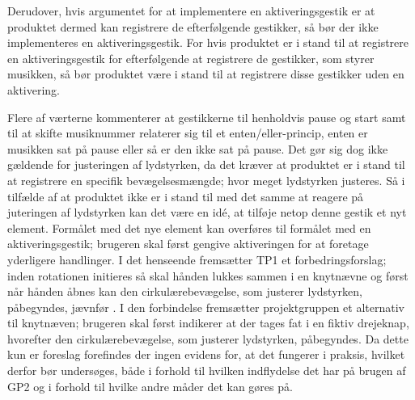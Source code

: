 Derudover, hvis argumentet for at implementere en aktiveringsgestik er at produktet dermed kan registrere de efterfølgende gestikker, så bør der ikke implementeres en aktiveringsgestik. For hvis produktet er i stand til at registrere en aktiveringsgestik for efterfølgende at registrere de gestikker, som styrer musikken, så bør produktet være i stand til at registrere disse gestikker uden en aktivering. 

Flere af værterne kommenterer at gestikkerne til henholdvis pause og start samt til at skifte musiknummer relaterer sig til et enten/eller-princip, enten er musikken sat på pause eller så er den ikke sat på pause. Det gør sig dog ikke gældende for justeringen af lydstyrken, da det kræver at produktet er i stand til at registrere en specifik bevægelsesmængde; hvor meget lydstyrken justeres. Så i tilfælde af at produktet ikke er i stand til med det samme at reagere på juteringen af lydstyrken kan det være en idé, at tilføje netop denne gestik et nyt element. Formålet med det nye element kan overføres til formålet med en aktiveringsgestik; brugeren skal først gengive aktiveringen for at foretage yderligere handlinger. I det henseende fremsætter TP1 et forbedringsforslag; inden rotationen initieres så skal hånden lukkes sammen i en knytnævne og først når hånden åbnes kan den cirkulærebevægelse, som justerer lydstyrken, påbegyndes, jævnfør . I den forbindelse fremsætter projektgruppen et alternativ til knytnæven; brugeren skal først indikerer at der tages fat i en fiktiv drejeknap, hvorefter den cirkulærebevægelse, som justerer lydstyrken, påbegyndes. Da dette kun er foreslag forefindes der ingen evidens for, at det fungerer i praksis, hvilket derfor bør undersøges, både i forhold til hvilken indflydelse det har på brugen af GP2 og i forhold til hvilke andre måder det kan gøres på.       


